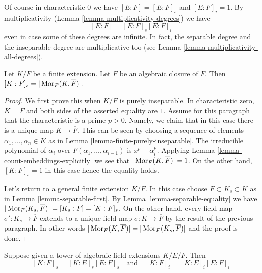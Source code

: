 \noindent
Of course in characteristic $0$ we have $[E : F] = [E : F]_s$ and
$[E : F]_i = 1$. By multiplicativity
(Lemma \ref{lemma-multiplicativity-degrees}) we have
$$
[E : F] = [E : F]_s [E : F]_i
$$
even in case some of these degrees are infinite. In fact, the separable
degree and the inseparable degree are multiplicative too (see
Lemma \ref{lemma-multiplicativity-all-degrees}).

\begin{lemma}
\label{lemma-separable-degree}
Let $K/F$ be a finite extension. Let $\overline{F}$ be an algebraic
closure of $F$. Then $[K : F]_s = |\mathop{\mathrm{Mor}}\nolimits_F(K, \overline{F})|$.
\end{lemma}

\begin{proof}
We first prove this when $K/F$ is purely inseparable. In characteristic
zero, $K = F$ and both sides of the asserted equality are $1$.
Assume for this paragraph that the characteristic is a prime $p > 0$.
Namely, we claim that
in this case there is a unique map $K \to \overline{F}$. This can be
seen by choosing a sequence of elements $\alpha_1, \ldots, \alpha_n \in K$
as in Lemma \ref{lemma-finite-purely-inseparable}. The irreducible polynomial
of $\alpha_i$ over $F(\alpha_1, \ldots, \alpha_{i - 1})$ is $x^p - \alpha_i^p$.
Applying Lemma \ref{lemma-count-embeddings-explicitly} we see that
$|\mathop{\mathrm{Mor}}\nolimits_F(K, \overline{F})| = 1$. On the other hand, $[K : F]_s = 1$
in this case hence the equality holds.

\medskip\noindent
Let's return to a general finite extension $K/F$. In this case
choose $F \subset K_s \subset K$ as in Lemma \ref{lemma-separable-first}.
By Lemma \ref{lemma-separable-equality} we have
$|\mathop{\mathrm{Mor}}\nolimits_F(K_s, \overline{F})| = [K_s : F] = [K : F]_s$.
On the other hand, every field map $\sigma' : K_s \to \overline{F}$
extends to a unique field map $\sigma : K \to \overline{F}$ by the
result of the previous paragraph. In other words
$|\mathop{\mathrm{Mor}}\nolimits_F(K, \overline{F})| = |\mathop{\mathrm{Mor}}\nolimits_F(K_s, \overline{F})|$
and the proof is done.
\end{proof}

\begin{lemma}[Multiplicativity]
\label{lemma-multiplicativity-all-degrees}
Suppose given a tower of algebraic field extensions $K/E/F$. Then
$$
[K : F]_s = [K : E]_s [E : F]_s
\quad\text{and}\quad
[K : F]_i = [K : E]_i [E : F]_i
$$
\end{lemma}

